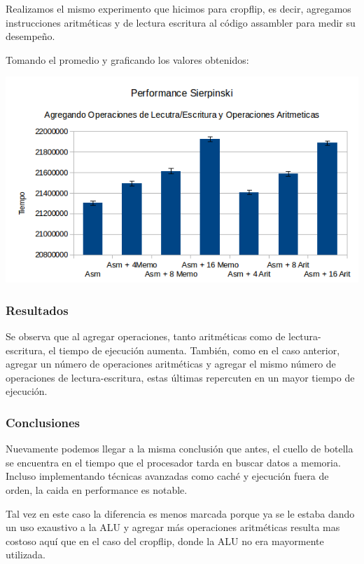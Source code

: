 \documentclass[a4paper]{article}
\begin{document}
Realizamos el mismo experimento que hicimos para cropflip, es decir, agregamos instrucciones aritméticas y de lectura escritura al código assambler para medir su desempeño.

Tomando el promedio y graficando los valores obtenidos:

  \begin{center}
  \includegraphics[scale=0.66]{Graficos1.5/sie/per.png}
  \end{center}

\subsubsection{Resultados}
Se observa que al agregar operaciones, tanto aritméticas como de lectura-escritura, el tiempo de ejecución aumenta. También, como en el caso anterior, agregar un número de operaciones aritméticas y agregar el mismo número de operaciones de lectura-escritura, estas últimas repercuten en un mayor tiempo de ejecución.

\subsubsection{Conclusiones}

Nuevamente podemos llegar a la misma conclusión que antes, el cuello de botella se encuentra en el tiempo que el procesador tarda en buscar datos a memoria. Incluso implementando técnicas avanzadas como caché y ejecución fuera de orden, la caida en performance es notable.

Tal vez en este caso la diferencia es menos marcada porque ya se le estaba dando un uso exaustivo a la ALU y agregar más operaciones aritméticas resulta mas costoso aquí que en el caso del cropflip, donde la ALU no era mayormente utilizada.
\end{document}
